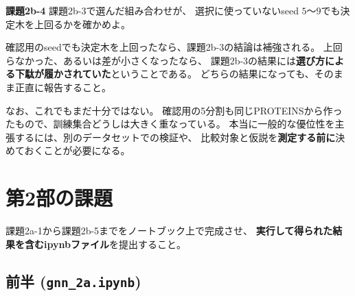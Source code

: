 \documentclass[11pt,a4paper]{jsarticle}
\begin{document}
\begin{screen}
\textbf{課題2b-4} \quad 課題2b-3で選んだ組み合わせが、
選択に使っていないseed $5$〜$9$でも決定木を上回るかを確かめよ。
\end{screen}

\noindent
確認用のseedでも決定木を上回ったなら、課題2b-3の結論は補強される。
上回らなかった、あるいは差が小さくなったなら、
課題2b-3の結果には\textbf{選び方による下駄が履かされていた}ということである。
どちらの結果になっても、そのまま正直に報告すること。

なお、これでもまだ十分ではない。
確認用の5分割も同じPROTEINSから作ったもので、訓練集合どうしは大きく重なっている。
本当に一般的な優位性を主張するには、別のデータセットでの検証や、
比較対象と仮説を\textbf{測定する前に}決めておくことが必要になる。

\section{第2部の課題}

課題2a-1から課題2b-5までをノートブック上で完成させ、
\textbf{実行して得られた結果を含むipynbファイル}を提出すること。

\subsection*{前半 (\texttt{gnn\_2a.ipynb})}
\end{document}
